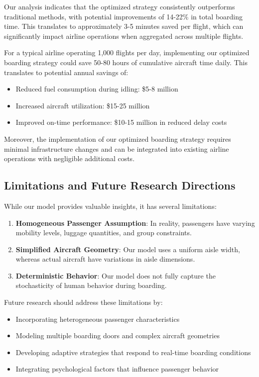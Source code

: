 \documentclass[a4paper,12pt]{article}
\begin{document}
Our analysis indicates that the optimized strategy consistently outperforms traditional methods, with potential improvements of 14-22\% in total boarding time. This translates to approximately 3-5 minutes saved per flight, which can significantly impact airline operations when aggregated across multiple flights.

For a typical airline operating 1,000 flights per day, implementing our optimized boarding strategy could save 50-80 hours of cumulative aircraft time daily. This translates to potential annual savings of:
\begin{itemize}
    \item Reduced fuel consumption during idling: \$5-8 million
    \item Increased aircraft utilization: \$15-25 million
    \item Improved on-time performance: \$10-15 million in reduced delay costs
\end{itemize}

Moreover, the implementation of our optimized boarding strategy requires minimal infrastructure changes and can be integrated into existing airline operations with negligible additional costs.

\subsection{Limitations and Future Research Directions}

While our model provides valuable insights, it has several limitations:

\begin{enumerate}
    \item \textbf{Homogeneous Passenger Assumption}: In reality, passengers have varying mobility levels, luggage quantities, and group constraints.

    \item \textbf{Simplified Aircraft Geometry}: Our model uses a uniform aisle width, whereas actual aircraft have variations in aisle dimensions.

    \item \textbf{Deterministic Behavior}: Our model does not fully capture the stochasticity of human behavior during boarding.
\end{enumerate}

Future research should address these limitations by:
\begin{itemize}
    \item Incorporating heterogeneous passenger characteristics
    \item Modeling multiple boarding doors and complex aircraft geometries
    \item Developing adaptive strategies that respond to real-time boarding conditions
    \item Integrating psychological factors that influence passenger behavior
\end{itemize}
\end{document}
